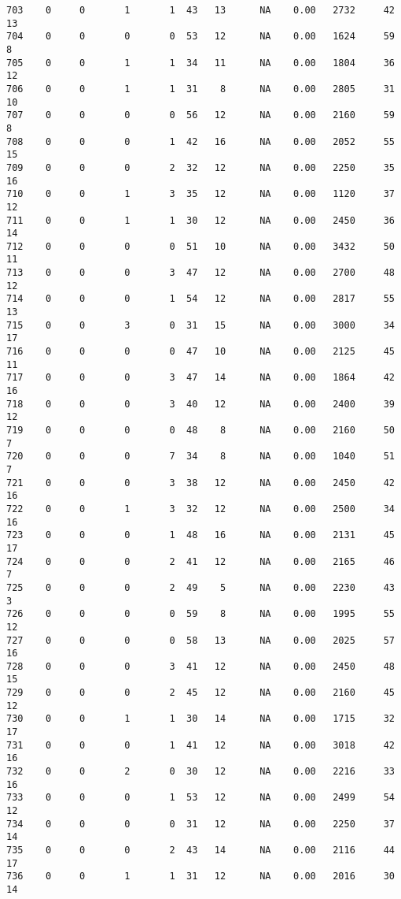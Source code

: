\documentclass[
  letterpaper,
  DIV=11,
  numbers=noendperiod]{scrreprt}
\begin{document}
\begin{verbatim}
703    0     0       1       1  43   13      NA    0.00   2732     42      13
704    0     0       0       0  53   12      NA    0.00   1624     59       8
705    0     0       1       1  34   11      NA    0.00   1804     36      12
706    0     0       1       1  31    8      NA    0.00   2805     31      10
707    0     0       0       0  56   12      NA    0.00   2160     59       8
708    0     0       0       1  42   16      NA    0.00   2052     55      15
709    0     0       0       2  32   12      NA    0.00   2250     35      16
710    0     0       1       3  35   12      NA    0.00   1120     37      12
711    0     0       1       1  30   12      NA    0.00   2450     36      14
712    0     0       0       0  51   10      NA    0.00   3432     50      11
713    0     0       0       3  47   12      NA    0.00   2700     48      12
714    0     0       0       1  54   12      NA    0.00   2817     55      13
715    0     0       3       0  31   15      NA    0.00   3000     34      17
716    0     0       0       0  47   10      NA    0.00   2125     45      11
717    0     0       0       3  47   14      NA    0.00   1864     42      16
718    0     0       0       3  40   12      NA    0.00   2400     39      12
719    0     0       0       0  48    8      NA    0.00   2160     50       7
720    0     0       0       7  34    8      NA    0.00   1040     51       7
721    0     0       0       3  38   12      NA    0.00   2450     42      16
722    0     0       1       3  32   12      NA    0.00   2500     34      16
723    0     0       0       1  48   16      NA    0.00   2131     45      17
724    0     0       0       2  41   12      NA    0.00   2165     46       7
725    0     0       0       2  49    5      NA    0.00   2230     43       3
726    0     0       0       0  59    8      NA    0.00   1995     55      12
727    0     0       0       0  58   13      NA    0.00   2025     57      16
728    0     0       0       3  41   12      NA    0.00   2450     48      15
729    0     0       0       2  45   12      NA    0.00   2160     45      12
730    0     0       1       1  30   14      NA    0.00   1715     32      17
731    0     0       0       1  41   12      NA    0.00   3018     42      16
732    0     0       2       0  30   12      NA    0.00   2216     33      16
733    0     0       0       1  53   12      NA    0.00   2499     54      12
734    0     0       0       0  31   12      NA    0.00   2250     37      14
735    0     0       0       2  43   14      NA    0.00   2116     44      17
736    0     0       1       1  31   12      NA    0.00   2016     30      14

\end{verbatim}
\end{document}
